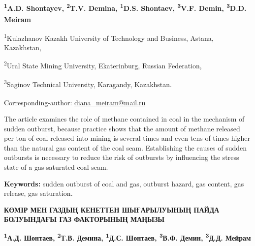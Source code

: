\vspace{1.5em}
\begin{articleheader}

{\bfseries
\textsuperscript{1}A.D. Shontayev,
\textsuperscript{2}T.V. Demina,
\textsuperscript{1}D.S. Shontaev,
\textsuperscript{3}V.F. Demin,
\textsuperscript{3}D.D. Meiram\textsuperscript{\envelope}
}
\end{articleheader}

\begin{affiliation}
\textsuperscript{1}Kulazhanov Kazakh University of Technology and Business, Astana, Kazakhstan,

\textsuperscript{2}Ural State Mining University, Ekaterinburg, Russian Federation,

\textsuperscript{3}Saginov Technical University, Karagandy, Kazakhstan.

\raggedright \textsuperscript{\envelope }Corresponding-author: \href{mailto:baiz76@mail.ru}{diana\_meiram@mail.ru}
\end{affiliation}

The article examines the role of methane contained in coal in the
mechanism of sudden outburst, because practice shows that the amount of
methane released per ton of coal released into mining is several times
and even tens of times higher than the natural gas content of the coal
seam. Establishing the causes of sudden outbursts is necessary to reduce
the risk of outbursts by influencing the stress state of a gas-saturated
coal seam.

{\bfseries Keywords:} sudden outburst of coal and gas, outburst hazard, gas
content, gas release, gas saturation.

\begin{articleheader}
{\bfseries КӨМІР МЕН ГАЗДЫҢ КЕНЕТТЕН ШЫҒАРЫЛУЫНЫҢ ПАЙДА БОЛУЫНДАҒЫ ГАЗ ФАКТОРЫНЫҢ МАҢЫЗЫ}

{\bfseries
\textsuperscript{1}А.Д. Шонтаев,
\textsuperscript{2}Т.В. Демина,
\textsuperscript{1}Д.С. Шонтаев,
\textsuperscript{3}В.Ф. Демин,
\textsuperscript{3}Д.Д. Мейрам\textsuperscript{\envelope }
}
\end{articleheader}

